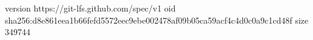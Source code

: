 version https://git-lfs.github.com/spec/v1
oid sha256:d8e861eea1b66fefd5572eec9ebe002478af09b05ca59acf4c4d0c0a9c1cd48f
size 349744
